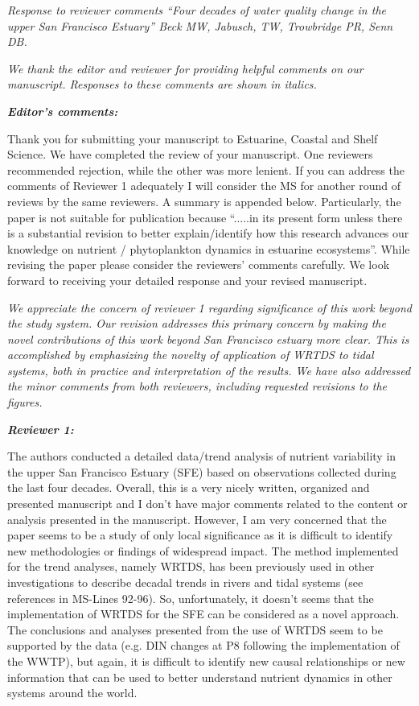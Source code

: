 \documentclass[letterpaper,12pt]{article}
\newcommand{\Bigtxt}[1]{\textbf{\textit{#1}}}
\begin{document}
\raggedright


{\it Response to reviewer comments ``Four decades of water quality change in the upper San Francisco Estuary'' Beck MW, Jabusch, TW, Trowbridge PR, Senn DB.}

{\it We thank the editor and reviewer for providing helpful comments on our manuscript.  Responses to these comments are shown in italics.}

\Bigtxt{Editor's comments:}

Thank you for submitting your manuscript to Estuarine, Coastal and Shelf Science. We have completed the review of your manuscript. One reviewers recommended rejection, while the other was more lenient. If you can address the comments of Reviewer 1 adequately I will consider the MS for another round of reviews by the same reviewers. A summary is appended below. Particularly, the paper is not suitable for publication because ``.....in its present form unless there is a substantial revision to better explain/identify how this research advances our knowledge on nutrient / phytoplankton dynamics in estuarine ecosystems''.  While revising the paper please consider the reviewers' comments carefully. We look forward to receiving your detailed response and your revised manuscript.

{\it We appreciate the concern of reviewer 1 regarding significance of this work beyond the study system.  Our revision addresses this primary concern by making the novel contributions of this work beyond San Francisco estuary more clear.  This is accomplished by emphasizing the novelty of application of WRTDS to tidal systems, both in practice and interpretation of the results. We have also addressed the minor comments from both reviewers, including requested revisions to the figures.
}

\Bigtxt{Reviewer 1:}

The authors conducted a detailed data/trend analysis of nutrient variability in the upper San Francisco Estuary (SFE) based on observations collected during the last four decades. Overall, this is a very nicely written, organized and presented manuscript and I don't have major comments related to the content or analysis presented in the manuscript. However, I am very concerned that the paper seems to be a study of only local significance as it is difficult to identify new methodologies or findings of widespread impact. The method implemented for the trend analyses, namely WRTDS, has been previously used in other investigations to describe decadal trends in rivers and tidal systems (see references in MS-Lines 92-96). So, unfortunately, it doesn't seems that the implementation of WRTDS for the SFE can be considered as a novel approach. The conclusions and analyses presented from the use of WRTDS seem to be supported by the data (e.g. DIN changes at P8 following the implementation of the WWTP), but again, it is difficult to identify new causal relationships or new information that can be used to better understand nutrient dynamics in other systems around the world.  
\end{document}
